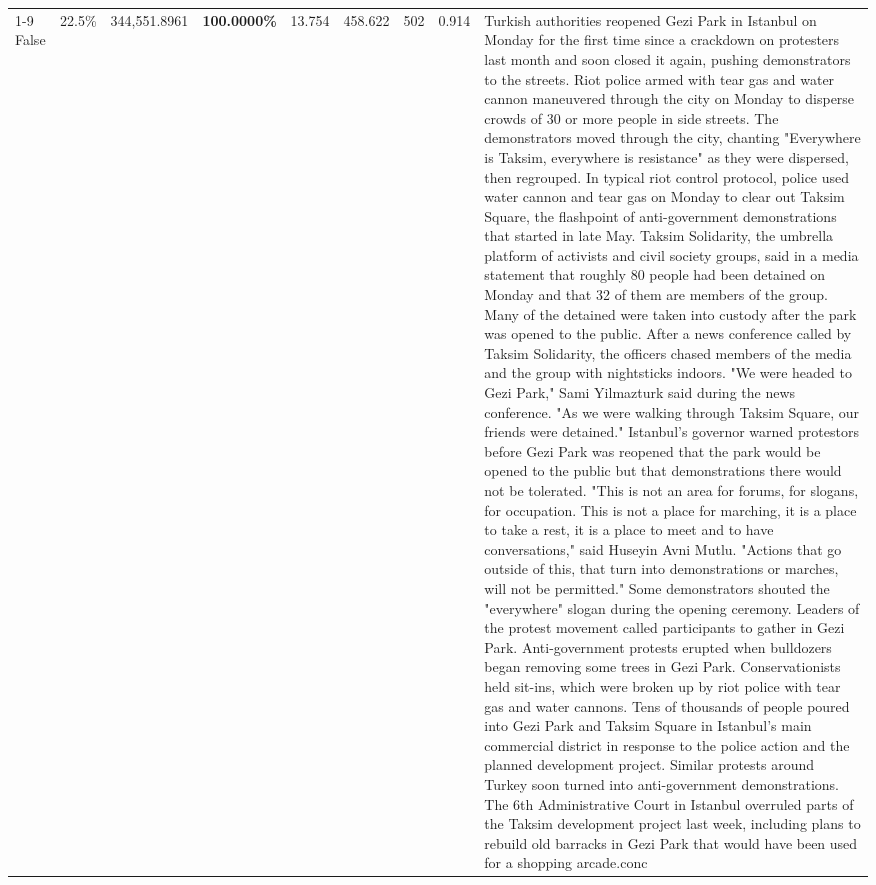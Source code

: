 \begin{table}[H]
\begin{tabular}{lllrlllll}
\cline{1-9}
False & 22.5\% & 344,551.8961 & \bfseries \color{red} 100.0000\% & 13.754 & 458.622 & 502 & 0.914 & Turkish authorities reopened Gezi Park in Istanbul on Monday for the first time since a crackdown on protesters last month and soon closed it again, pushing demonstrators to the streets. Riot police armed with tear gas and water cannon maneuvered through the city on Monday to disperse crowds of 30 or more people in side streets. The demonstrators moved through the city, chanting "Everywhere is Taksim, everywhere is resistance" as they were dispersed, then regrouped. In typical riot control protocol, police used water cannon and tear gas on Monday to clear out Taksim Square, the flashpoint of anti-government demonstrations that started in late May. Taksim Solidarity, the umbrella platform of activists and civil society groups, said in a media statement that roughly 80 people had been detained on Monday and that 32 of them are members of the group. Many of the detained were taken into custody after the park was opened to the public. After a news conference called by Taksim Solidarity, the officers chased members of the media and the group with nightsticks indoors. "We were headed to Gezi Park," Sami Yilmazturk said during the news conference. "As we were walking through Taksim Square, our friends were detained." Istanbul's governor warned protestors before Gezi Park was reopened that the park would be opened to the public but that demonstrations there would not be tolerated. "This is not an area for forums, for slogans, for occupation. This is not a place for marching, it is a place to take a rest, it is a place to meet and to have conversations," said Huseyin Avni Mutlu. "Actions that go outside of this, that turn into demonstrations or marches, will not be permitted." Some demonstrators shouted the "everywhere" slogan during the opening ceremony. Leaders of the protest movement called participants to gather in Gezi Park. Anti-government protests erupted when bulldozers began removing some trees in Gezi Park. Conservationists held sit-ins, which were broken up by riot police with tear gas and water cannons. Tens of thousands of people poured into Gezi Park and Taksim Square in Istanbul's main commercial district in response to the police action and the planned development project. Similar protests around Turkey soon turned into anti-government demonstrations. The 6th Administrative Court in Istanbul overruled parts of the Taksim development project last week, including plans to rebuild old barracks in Gezi Park that would have been used for a shopping arcade.conc \\

\end{tabular}
\end{table}
